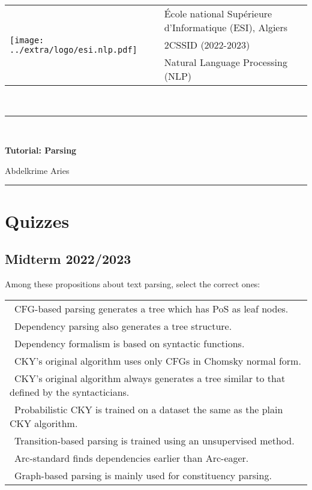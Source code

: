 \documentclass[11pt, a4paper]{article}
\begin{document}
	
	
	\noindent
	\begin{tabular}{ll}
		\multirow{3}{*}{\texttt{[image: ../extra/logo/esi.nlp.pdf]}} & 
		\'Ecole national Supérieure d'Informatique (ESI), Algiers\\
		& 2CSSID (2022-2023)\\
		& Natural Language Processing (NLP)
	\end{tabular}\\[.25cm]
	\noindent\rule{\textwidth}{2pt}\\[-0.5cm]
	\begin{center}
		{\LARGE \textbf{Tutorial: Parsing}}
		\begin{flushright}
			Abdelkrime Aries
		\end{flushright}
	\end{center}\vspace{-0.5cm}
	\noindent\rule{\textwidth}{2pt}


\section{Quizzes}

\subsection{Midterm 2022/2023}

Among these propositions about text parsing, select the correct ones:

\begin{longtable}{|p{}|}
	\hline 
	\Square\ CFG-based parsing generates a tree which has PoS as leaf nodes. \\
	\Square\ Dependency parsing also generates a tree structure. \\	
	\Square\ Dependency formalism is based on syntactic functions. \\
	\Square\ CKY's original algorithm uses only CFGs in Chomsky normal form. \\
	\Square\ CKY's original algorithm always generates a tree similar to that defined by the syntacticians. \\
	\Square\ Probabilistic CKY is trained on a dataset the same as the plain CKY algorithm. \\
	\Square\ Transition-based parsing is trained using an unsupervised method. \\
	\Square\ Arc-standard finds dependencies earlier than Arc-eager. \\
	\Square\ Graph-based parsing is mainly used for constituency parsing.\\
	\hline
\end{longtable}
\end{document}
